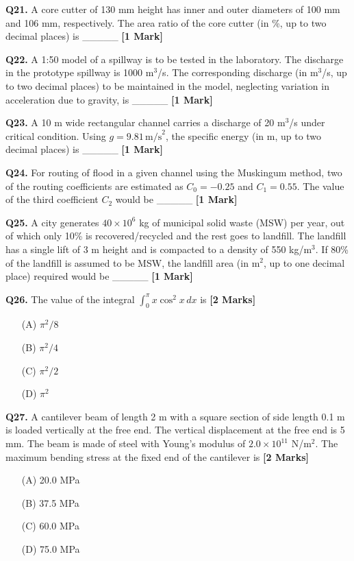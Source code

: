 \documentclass[11pt]{article}
\newcommand{\questiona}[2]{
    \noindent\textbf{Q#2.} #1 \hfill \textbf{[1 Mark]}
}
\newcommand{\questionb}[2]{
    \noindent\textbf{Q#2.} #1 \hfill \textbf{[2 Marks]}
}
\begin{document}
\questiona{A core cutter of 130 mm height has inner and outer diameters of 100 mm and 106 mm, respectively. The area ratio of the core cutter (in \%, up to two decimal places) is \_\_\_\_\_}{21}
\vspace{0.5cm}

\questiona{A 1:50 model of a spillway is to be tested in the laboratory. The discharge in the prototype spillway is 1000 m\(^3\)/s. The corresponding discharge (in m\(^3\)/s, up to two decimal places) to be maintained in the model, neglecting variation in acceleration due to gravity, is \_\_\_\_\_}{22}
\vspace{0.5cm}

\questiona{A 10 m wide rectangular channel carries a discharge of 20 m\(^3\)/s under critical condition. Using \( g = 9.81 \, \text{m/s}^2 \), the specific energy (in m, up to two decimal places) is \_\_\_\_\_}{23}
\vspace{0.5cm}

\questiona{For routing of flood in a given channel using the Muskingum method, two of the routing coefficients are estimated as \( C_0 = -0.25 \) and \( C_1 = 0.55 \). The value of the third coefficient \( C_2 \) would be \_\_\_\_\_}{24}
\vspace{0.5cm}

\questiona{A city generates \( 40 \times 10^6 \) kg of municipal solid waste (MSW) per year, out of which only 10\% is recovered/recycled and the rest goes to landfill. The landfill has a single lift of 3 m height and is compacted to a density of 550 kg/m\(^3\). If 80\% of the landfill is assumed to be MSW, the landfill area (in m\(^2\), up to one decimal place) required would be \_\_\_\_\_}{25}
\vspace{0.5cm}

\questionb{The value of the integral \( \int_{0}^{\pi} x \cos^{2} x \, dx \) is}{26}
\begin{enumerate}
    \item[(A)] \( \pi^{2}/8 \)
    \item[(B)] \( \pi^{2}/4 \)
    \item[(C)] \( \pi^{2}/2 \)
    \item[(D)] \( \pi^{2} \)
\end{enumerate}
\vspace{0.5cm}

\questionb{A cantilever beam of length 2 m with a square section of side length 0.1 m is loaded vertically at the free end. The vertical displacement at the free end is 5 mm. The beam is made of steel with Young's modulus of \( 2.0 \times 10^{11} \) N/m\(^2\). The maximum bending stress at the fixed end of the cantilever is}{27}
\begin{enumerate}
    \item[(A)] 20.0 MPa
    \item[(B)] 37.5 MPa
    \item[(C)] 60.0 MPa
    \item[(D)] 75.0 MPa
\end{enumerate}
\vspace{0.5cm}
\end{document}
